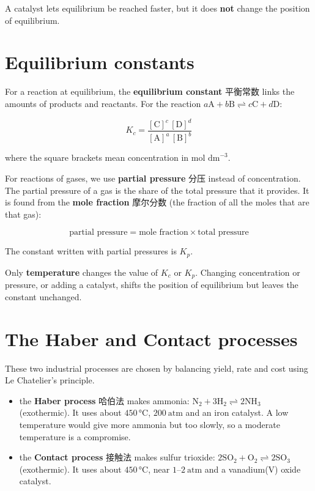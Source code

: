 \documentclass[11pt]{article}
\begin{document}
A catalyst lets equilibrium be reached faster, but it does \textbf{not} change the position of equilibrium.

\section*{Equilibrium constants}

For a reaction at equilibrium, the \textbf{equilibrium constant} 平衡常数 links the amounts of products and reactants. For the reaction $a\text{A} + b\text{B} \rightleftharpoons c\text{C} + d\text{D}$:

\[
K_c = \frac{[\text{C}]^c\,[\text{D}]^d}{[\text{A}]^a\,[\text{B}]^b}
\]

where the square brackets mean concentration in $\text{mol dm}^{-3}$.

For reactions of gases, we use \textbf{partial pressure} 分压 instead of concentration. The partial pressure of a gas is the share of the total pressure that it provides. It is found from the \textbf{mole fraction} 摩尔分数 (the fraction of all the moles that are that gas):

\[
\text{partial pressure} = \text{mole fraction} \times \text{total pressure}
\]

The constant written with partial pressures is $K_p$.

Only \textbf{temperature} changes the value of $K_c$ or $K_p$. Changing concentration or pressure, or adding a catalyst, shifts the position of equilibrium but leaves the constant unchanged.

\section*{The Haber and Contact processes}

These two industrial processes are chosen by balancing yield, rate and cost using Le Chatelier's principle.

\begin{itemize}
\item the \textbf{Haber process} 哈伯法 makes ammonia: $\text{N}_2 + 3\text{H}_2 \rightleftharpoons 2\text{NH}_3$ (exothermic). It uses about $450\,°\text{C}$, $200\ \text{atm}$ and an iron catalyst. A low temperature would give more ammonia but too slowly, so a moderate temperature is a compromise.

\item the \textbf{Contact process} 接触法 makes sulfur trioxide: $2\text{SO}_2 + \text{O}_2 \rightleftharpoons 2\text{SO}_3$ (exothermic). It uses about $450\,°\text{C}$, near $1$–$2\ \text{atm}$ and a vanadium(V) oxide catalyst.

\end{itemize}
\end{document}
